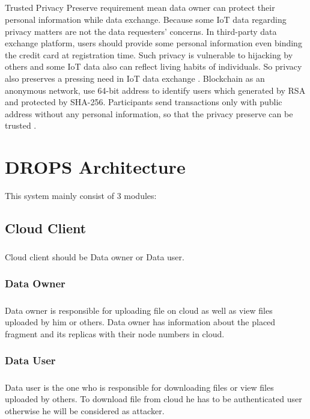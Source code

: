 \begin{enumerate}
\paragraph{}Trusted Privacy Preserve requirement mean data owner
can protect their personal information while data exchange.
Because some IoT data regarding privacy matters are not the
data requesters’ concerns.
In third-party data exchange platform, users should
provide some personal information even binding the credit
card at registration time. Such privacy is vulnerable to
hijacking by others and some IoT data also can reflect living
habits of individuals. So privacy also preserves a pressing
need in IoT data exchange .
Blockchain as an anonymous network, use 64-bit address
to identify users which generated by RSA and protected by
SHA-256. Participants send transactions only with public
address without any personal information, so that the privacy
preserve can be trusted .
\end{enumerate}

\chapter{ DROPS Architecture}

This system mainly consist of 3 modules:
\section{Cloud Client}
\paragraph*{} 
Cloud client should be Data owner or Data user.
\subsection{Data Owner}
\paragraph*{}
Data owner is responsible for uploading file on cloud as well as view files uploaded by him or others. Data owner has information about the placed fragment and its replicas with their node numbers in cloud. 
\subsection{Data User}
\paragraph*{}
Data user is the one who is responsible for downloading files or view files uploaded by others. To download file from cloud he has to be authenticated user otherwise he will be considered as attacker.
